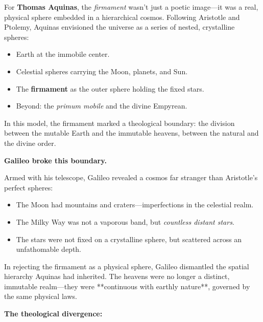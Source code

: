\begin{tcolorbox}[colback=gray!5, colframe=black, title=\textbf{Historical Sidebar: Aquinas, Galileo, and the Unraveling of the Firmament}, fonttitle=\bfseries, arc=1.5mm, boxrule=0.4pt]

    For \textbf{Thomas Aquinas}, the \emph{firmament} wasn’t just a poetic image—it was a real, physical sphere embedded in a hierarchical cosmos. Following Aristotle and Ptolemy, Aquinas envisioned the universe as a series of nested, crystalline spheres:
    
    \begin{itemize}
      \item Earth at the immobile center.
      \item Celestial spheres carrying the Moon, planets, and Sun.
      \item The \textbf{firmament} as the outer sphere holding the fixed stars.
      \item Beyond: the \emph{primum mobile} and the divine Empyrean.
    \end{itemize}
    
    In this model, the firmament marked a theological boundary: the division between the mutable Earth and the immutable heavens, between the natural and the divine order.
    
    \medskip
    
    \textbf{Galileo broke this boundary.}
    
    Armed with his telescope, Galileo revealed a cosmos far stranger than Aristotle’s perfect spheres:
    
    \begin{itemize}
      \item The Moon had mountains and craters—imperfections in the celestial realm.
      \item The Milky Way was not a vaporous band, but \emph{countless distant stars}.
      \item The stars were not fixed on a crystalline sphere, but scattered across an unfathomable depth.
    \end{itemize}
    
    In rejecting the firmament as a physical sphere, Galileo dismantled the spatial hierarchy Aquinas had inherited. The heavens were no longer a distinct, immutable realm—they were **continuous with earthly nature**, governed by the same physical laws.
    
    \medskip
    
    \textbf{The theological divergence:}
    

\end{tcolorbox}
